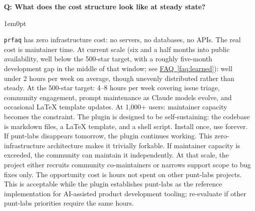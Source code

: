 \documentclass[11pt,letterpaper]{article}
\newcounter{faqnum}
\newenvironment{faqpair}[1]{%
  \needspace{4\baselineskip}%
  \vspace{0.5em}%
  \refstepcounter{faqnum}%
  \noindent\textbf{\color{SectionBlue}Q\thefaqnum: #1}\par\nopagebreak[4]%
  \vspace{0.2em}%
  \begin{adjustwidth}{1em}{0pt}%
  \setlength{\parindent}{0pt}%
}{%
  \end{adjustwidth}%
  \vspace{0.5em}%
}
\newcommand{\faqref}[1]{\hyperref[#1]{FAQ~\ref*{#1}}}
\begin{document}
\begin{faqpair}{What does the cost structure look like at steady state?}
  \texttt{prfaq} has zero infrastructure cost: no servers, no databases, no APIs. The real cost is maintainer time. At current scale (six and a half months into public availability, well below the 500-star target, with a roughly five-month development gap in the middle of that window; see \faqref{faq:learned}): well under 2 hours per week on average, though unevenly distributed rather than steady. At the 500-star target: 4--8 hours per week covering issue triage, community engagement, prompt maintenance as Claude models evolve, and occasional LaTeX template updates. At 1,000+ users: maintainer capacity becomes the constraint. The plugin is designed to be self-sustaining: the codebase is markdown files, a LaTeX template, and a shell script. Install once, use forever. If punt-labs disappears tomorrow, the plugin continues working. This zero-infrastructure architecture makes it trivially forkable. If maintainer capacity is exceeded, the community can maintain it independently. At that scale, the project either recruits community co-maintainers or narrows support scope to bug fixes only. The opportunity cost is hours not spent on other punt-labs projects. This is acceptable while the plugin establishes punt-labs as the reference implementation for AI-assisted product development tooling; re-evaluate if other punt-labs priorities require the same hours.
\end{faqpair}
\end{document}
